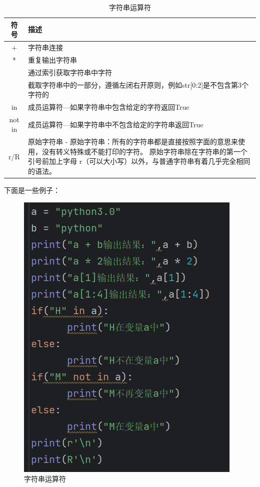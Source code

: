 \documentclass{ctexart}
\begin{document}
	\begin{table}[h]
		\centering
		\caption{字符串运算符}
		\begin{tabular}{|c|p{10cm}|}
			\hline
			符号 & 描述  \\
			\hline
			+ & 字符串连接 \\
			\hline
			* & 重复输出字符串\\
			\hline
			[] &通过索引获取字符串中字符\\ 
			\hline
			[:] & 截取字符串中的一部分，遵循左闭右开原则，例如str[0:2]是不包含第3个字符的\\
			\hline
			in&成员运算符—如果字符串中包含给定的字符返回True\\
			\hline
			not in&成员运算符—如果字符串中不包含给定的字符串返回True\\
			\hline
			r/R&原始字符串 - 原始字符串：所有的字符串都是直接按照字面的意思来使用，没有转义特殊或不能打印的字符。 原始字符串除在字符串的第一个引号前加上字母 r（可以大小写）以外，与普通字符串有着几乎完全相同的语法。\\
			\hline
		\end{tabular}
	\end{table}
	
	下面是一些例子：
	
	\begin{figure}[H]
		\centering
		\includegraphics[scale=0.5]{3.23}
		\caption{字符串运算符}
	\end{figure}
	
\end{document}
